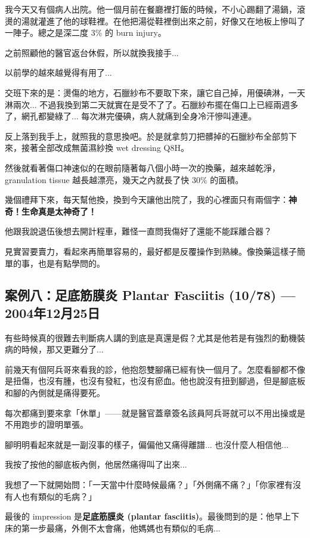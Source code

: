 \documentclass[12pt,a4paper]{article}
\newenvironment{myquote}{%
    \begin{tcolorbox}[
        colback=quote_bg,
        colframe=emergency_gray,
        boxrule=0pt,
        leftrule=3pt,
        arc=0pt,
        left=10pt,
        right=10pt,
        top=8pt,
        bottom=8pt
    ]
    \itshape
}{%
    \end{tcolorbox}
}
\begin{document}
我今天又有個病人出院。他一個月前在餐廳裡打飯的時候，不小心踢翻了湯鍋，滾燙的湯就灌進了他的球鞋裡。在他把湯從鞋裡倒出來之前，好像又在地板上慘叫了一陣子。總之是深二度 3\% 的 burn injury。

之前照顧他的醫官返台休假，所以就換我接手...

以前學的越來越覺得有用了...

交班下來的是：燙傷的地方，石臘紗布不要取下來，讓它自己掉，用優碘淋，一天淋兩次... 不過我換到第二天就實在是受不了了。石臘紗布擺在傷口上已經兩週多了，網孔都變綠了... 每次淋完優碘，病人就痛到全身冷汗慘叫連連。

反上落到我手上，就照我的意思換吧。於是就拿剪刀把髒掉的石臘紗布全部剪下來，接著全部改成無菌濕紗換 wet dressing Q8H。

然後就看著傷口神速似的在眼前隨著每八個小時一次的換藥，越來越乾淨，granulation tissue 越長越漂亮，幾天之內就長了快 30\% 的面積。

幾個禮拜下來，每天幫他換，換到今天讓他出院了，我的心裡面只有兩個字：\textbf{神奇！生命真是太神奇了！}

他跟我說退伍後想去開計程車，難怪一直問我傷好了還能不能踩離合器？

\begin{myquote}
見實習要賣力，看起來再簡單容易的，最好都是反覆操作到熟練。像換藥這樣子簡單的事，也是有點學問的。
\end{myquote}

\subsection{案例八：足底筋膜炎 Plantar Fasciitis (10/78) — 2004年12月25日}

有些時候真的很難去判斷病人講的到底是真還是假？尤其是他若是有強烈的動機裝病的時候，那又更難分了...

前幾天有個阿兵哥來看我的診，他抱怨雙腳痛已經有快一個月了。怎麼看腳都不像是扭傷，也沒有腫，也沒有發紅，也沒有瘀血。他也說沒有扭到腳過，但是腳底板和腳的內側就是痛得要死。

每次都痛到要來拿「休單」——就是醫官蓋章簽名該員阿兵哥就可以不用出操或是不用跑步的證明單張。

腳明明看起來就是一副沒事的樣子，偏偏他又痛得離譜... 也沒什麼人相信他...

我按了按他的腳底板內側，他居然痛得叫了出來...

我想了一下就開始問：「一天當中什麼時候最痛？」「外側痛不痛？」「你家裡有沒有人也有類似的毛病？」

最後的 impression 是\textbf{足底筋膜炎 (plantar fasciitis)}。最後問到的是：他早上下床的第一步最痛，外側不太會痛，他媽媽也有類似的毛病...
\end{document}
